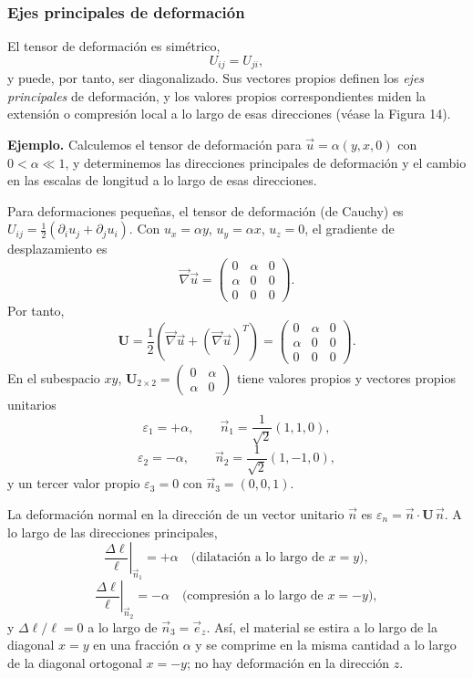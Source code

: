\subsubsection{Ejes principales de deformación}

El tensor de deformación es simétrico,
\[ U_{ij} = U_{ji}, \tag{102} \]
y puede, por tanto, ser diagonalizado. Sus vectores propios definen los \emph{ejes principales} de deformación, y los valores propios correspondientes miden la extensión o compresión local a lo largo de esas direcciones (véase la Figura 14).

\textbf{Ejemplo.} Calculemos el tensor de deformación para $\vec{u} = \alpha(y, x, 0)$ con $0 < \alpha \ll 1$, y determinemos las direcciones principales de deformación y el cambio en las escalas de longitud a lo largo de esas direcciones.

Para deformaciones pequeñas, el tensor de deformación (de Cauchy) es $U_{ij} = \frac{1}{2}(\partial_i u_j + \partial_j u_i)$. Con $u_x = \alpha y$, $u_y = \alpha x$, $u_z = 0$, el gradiente de desplazamiento es
\[ \vec{\nabla}\vec{u} = \begin{pmatrix} 0 & \alpha & 0 \\ \alpha & 0 & 0 \\ 0 & 0 & 0 \end{pmatrix}. \]
Por tanto,
\[ \mathbf{U} = \frac{1}{2}\left(\vec{\nabla}\vec{u} + (\vec{\nabla}\vec{u})^{T}\right) = \begin{pmatrix} 0 & \alpha & 0 \\ \alpha & 0 & 0 \\ 0 & 0 & 0 \end{pmatrix}. \]
En el subespacio $xy$, $\mathbf{U}_{2\times 2} = \begin{pmatrix} 0 & \alpha \\ \alpha & 0 \end{pmatrix}$ tiene valores propios y vectores propios unitarios
\[ \varepsilon_1 = +\alpha, \qquad \vec{n}_1 = \frac{1}{\sqrt{2}}(1, 1, 0), \]
\[ \varepsilon_2 = -\alpha, \qquad \vec{n}_2 = \frac{1}{\sqrt{2}}(1, -1, 0), \]
y un tercer valor propio $\varepsilon_3 = 0$ con $\vec{n}_3 = (0, 0, 1)$.

La deformación normal en la dirección de un vector unitario $\vec{n}$ es $\varepsilon_n = \vec{n}\cdot\mathbf{U}\,\vec{n}$. A lo largo de las direcciones principales,
\[ \left.\frac{\Delta\ell}{\ell}\right|_{\vec{n}_1} = +\alpha \quad \text{(dilatación a lo largo de } x = y\text{)}, \]
\[ \left.\frac{\Delta\ell}{\ell}\right|_{\vec{n}_2} = -\alpha \quad \text{(compresión a lo largo de } x = -y\text{)}, \]
y $\Delta\ell/\ell = 0$ a lo largo de $\vec{n}_3 = \vec{e}_z$. Así, el material se estira a lo largo de la diagonal $x = y$ en una fracción $\alpha$ y se comprime en la misma cantidad a lo largo de la diagonal ortogonal $x = -y$; no hay deformación en la dirección $z$.


